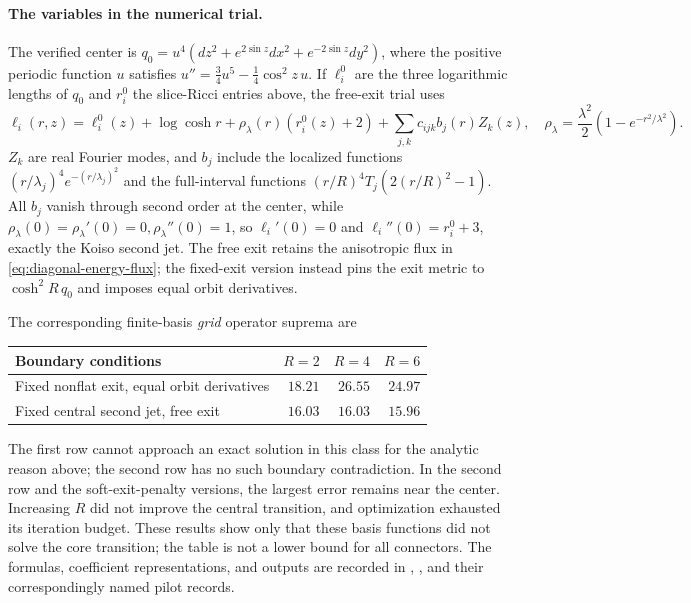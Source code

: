 \documentclass[a4paper,11pt]{article}
\numberwithin{equation}{section}
\theoremstyle{definition}
\begin{document}
\paragraph{The variables in the numerical trial.}
The verified center is $q_0=u^4(dz^2+e^{2\sin z}dx^2+e^{-2\sin z}dy^2)$,
where the positive periodic function $u$ satisfies
$u''=\frac34u^5-\frac14\cos^2z\,u$.
If $\ell_i^0$ are the three logarithmic lengths of $q_0$ and $r_i^0$ the slice-Ricci entries above, the free-exit trial uses
\begin{equation}\label{eq:diagonal-core-ansatz}
 \ell_i(r,z)=\ell_i^0(z)+\log\cosh r
 +\rho_\lambda(r)(r_i^0(z)+2)
 +\sum_{j,k}c_{ijk}b_j(r)Z_k(z),
 \quad
 \rho_\lambda=\frac{\lambda^2}{2}(1-e^{-r^2/\lambda^2}).
\end{equation}
$Z_k$ are real Fourier modes, and $b_j$ include the localized functions
$(r/\lambda_j)^4e^{-(r/\lambda_j)^2}$ and the full-interval functions
$(r/R)^4T_j(2(r/R)^2-1)$. All $b_j$ vanish through second order at the center, while
$\rho_\lambda(0)=\rho_\lambda'(0)=0,\rho_\lambda''(0)=1$,
so $\ell_i'(0)=0$ and $\ell_i''(0)=r_i^0+3$, exactly the Koiso second jet.
The free exit retains the anisotropic flux in \eqref{eq:diagonal-energy-flux}; the fixed-exit version instead pins the exit metric to $\cosh^2R\,q_0$ and imposes equal orbit derivatives.

The corresponding finite-basis \emph{grid} operator suprema are
\begin{center}
\begin{tabular}{lrrr}
\toprule Boundary conditions & $R=2$ & $R=4$ & $R=6$\\\midrule
Fixed nonflat exit, equal orbit derivatives & $18.21$ & $26.55$ & $24.97$\\
Fixed central second jet, free exit & $16.03$ & $16.03$ & $15.96$\\\bottomrule
\end{tabular}
\end{center}
The first row cannot approach an exact solution in this class for the analytic reason above; the second row has no such boundary contradiction.
In the second row and the soft-exit-penalty versions, the largest error remains near the center. Increasing $R$ did not improve the central transition, and optimization exhausted its iteration budget.
These results show only that these basis functions did not solve the core transition; the table is not a lower bound for all connectors.
The formulas, coefficient representations, and outputs are recorded in
,
, and their correspondingly named pilot records.
\end{document}
